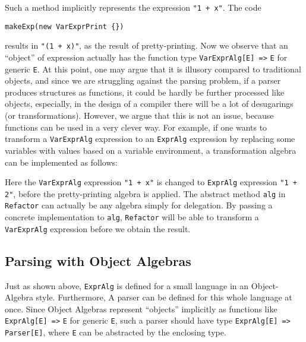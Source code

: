 Such a method implicitly represents the expression \lstinline{"1 + x"}. The code

\begin{lstlisting}
makeExp(new VarExprPrint {})
\end{lstlisting}
results in \lstinline{"(1 + x)"}, as the result of pretty-printing. Now we observe that an ``object'' of expression actually
has the function type \lstinline{VarExprAlg[E] =>} \lstinline{E} for generic \lstinline{E}. At this point, one may argue
that it is illusory compared to traditional objects, and since we are struggling against the parsing problem, if a parser
produces structures as functions, it could be hardly be further processed like objects, especially, in the design of a compiler
there will be a lot of desugarings (or transformations). However, we argue that this is not an issue, because functions can be used
in a very clever way. For example, if one wants to transform a \lstinline{VarExprAlg} expression to an \lstinline{ExprAlg} expression by
replacing some variables with values based on a variable environment, a transformation algebra can be implemented as follows:

Here the \lstinline{VarExprAlg} expression \lstinline{"1 + x"} is changed to \lstinline{ExprAlg} expression \lstinline{"1 + 2"}, before the pretty-printing algebra is applied. The abstract method
\lstinline{alg} in \lstinline{Refactor} can actually be any algebra simply for delegation. By passing a concrete implementation
to \lstinline{alg}, \lstinline{Refactor} will be able to transform a \lstinline{VarExprAlg} expression before we obtain the result.

\subsection{Parsing with Object Algebras}\label{subsec:parsingwithoa}

Just as shown above, \lstinline{ExprAlg} is defined for a small language in an Object-Algebra style. Furthermore,
A parser can be defined for this whole language at once. Since Object Algebras represent ``objects'' implicitly as functions like \lstinline{ExprAlg[E] =>} \lstinline{E} for generic \lstinline{E}, such a parser should have type \lstinline{ExprAlg[E] =>} \lstinline{Parser[E]}, where \lstinline{E} can be abstracted by the enclosing type.

